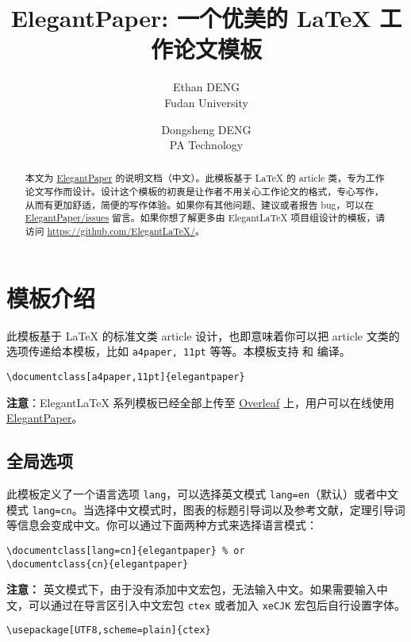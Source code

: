 \documentclass[lang=cn,11pt,numbers, a4paper]{elegantpaper}
\title{ElegantPaper: 一个优美的 \LaTeX{} 工作论文模板}
\author{Ethan DENG \\ Fudan University \and Dongsheng DENG \\ PA Technology}
\institute{\href{https://elegantlatex.org/}{Elegant\LaTeX{} 项目组}}
\date{\zhtoday}
\begin{document}
\maketitle

\begin{abstract}
本文为 \href{https://github.com/ElegantLaTeX/ElegantPaper/}{ElegantPaper} 的说明文档（中文）。此模板基于 \LaTeX{} 的 article 类，专为工作论文写作而设计。设计这个模板的初衷是让作者不用关心工作论文的格式，专心写作，从而有更加舒适，简便的写作体验。如果你有其他问题、建议或者报告 bug，可以在 \href{https://github.com/ElegantLaTeX/ElegantPaper/issues}{ElegantPaper/issues} 留言。如果你想了解更多由 Elegant\LaTeX{} 项目组设计的模板，请访问 \href{https://github.com/ElegantLaTeX/}{https://github.com/ElegantLaTeX/}。
\end{abstract}


\section{模板介绍}

此模板基于 \LaTeX{} 的标准文类 article 设计，也即意味着你可以把 article 文类的选项传递给本模板，比如 \lstinline{a4paper, 11pt} 等等。本模板支持  和  编译。

\begin{lstlisting}
\documentclass[a4paper,11pt]{elegantpaper}
\end{lstlisting}

\textbf{注意}：Elegant\LaTeX{} 系列模板已经全部上传至 \href{https://www.overleaf.com}{Overleaf} 上，用户可以在线使用 \href{https://www.overleaf.com/latex/templates/elegantpaper-template/yzghrqjhmmmr}{ElegantPaper}。
  
\subsection{全局选项}
此模板定义了一个语言选项 \lstinline{lang}，可以选择英文模式 \lstinline{lang=en}（默认）或者中文模式 \lstinline{lang=cn}。当选择中文模式时，图表的标题引导词以及参考文献，定理引导词等信息会变成中文。你可以通过下面两种方式来选择语言模式：
\begin{lstlisting}
\documentclass[lang=cn]{elegantpaper} % or
\documentclass{cn}{elegantpaper} 
\end{lstlisting}

\textbf{注意：} 英文模式下，由于没有添加中文宏包，无法输入中文。如果需要输入中文，可以通过在导言区引入中文宏包 \lstinline{ctex} 或者加入 \lstinline{xeCJK} 宏包后自行设置字体。 
\begin{lstlisting}
\usepackage[UTF8,scheme=plain]{ctex}
\end{lstlisting}
\end{document}

